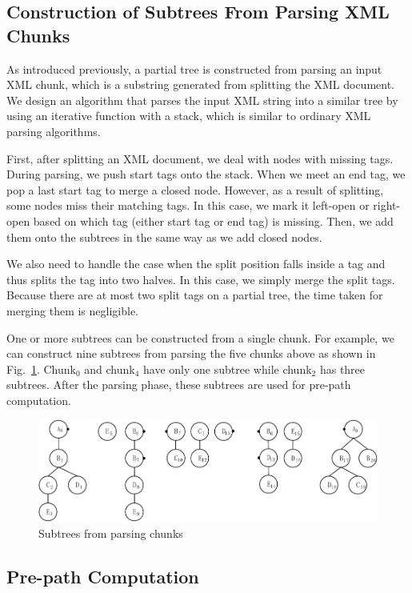 \subsection{Construction of Subtrees From Parsing XML Chunks}

As introduced previously, a partial tree is constructed from parsing an input
XML chunk, which is a substring generated from splitting the XML document. We
design an algorithm that parses the input XML string into a similar tree by
using an iterative function with a stack, which is similar to ordinary XML
parsing algorithms.

First, after splitting an XML document, we deal with nodes with missing tags.
During parsing, we push start tags onto the stack. When we meet an end tag, we
pop a last start tag to merge a closed node. However, as a result of splitting,
some nodes miss their matching tags. In this case, we mark it left-open or
right-open based on which tag (either start tag or end tag) is missing. Then, we
add them onto the subtrees in the same way as we add closed nodes.

We also need to handle the case when the split position falls inside a tag and
thus splits the tag into two halves. In this case, we simply merge the split
tags. Because there are at most two split tags on a partial tree, the time taken
for merging them is negligible.

One or more subtrees can be constructed from a single chunk. For example, we
can construct nine subtrees from parsing the five chunks above as shown in
Fig.~\ref{fig:partialtree-notfinished}. Chunk$_0$ and chunk$_4$ have only one
subtree while chunk$_2$ has three subtrees. After the parsing phase, these
subtrees are used for pre-path computation.

\begin{figure}[t]
	\centering\includegraphics[]{partialtree/figures/fromWord-6.pdf}
	\caption{Subtrees from parsing chunks}
	\label{fig:partialtree-notfinished}
\end{figure}


\subsection{Pre-path Computation}

